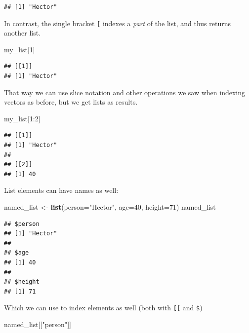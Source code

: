 \documentclass[]{article}
\newenvironment{Shaded}{\begin{snugshade}}{\end{snugshade}}
\newcommand{\KeywordTok}[1]{\textcolor[rgb]{0.13,0.29,0.53}{\textbf{{#1}}}}
\newcommand{\DataTypeTok}[1]{\textcolor[rgb]{0.13,0.29,0.53}{{#1}}}
\newcommand{\DecValTok}[1]{\textcolor[rgb]{0.00,0.00,0.81}{{#1}}}
\newcommand{\StringTok}[1]{\textcolor[rgb]{0.31,0.60,0.02}{{#1}}}
\newcommand{\NormalTok}[1]{{#1}}
\theoremstyle{definition}
\theoremstyle{definition}
\theoremstyle{remark}
\begin{document}
\begin{verbatim}
## [1] "Hector"
\end{verbatim}

In contrast, the single bracket \texttt{{[}} indexes a \emph{part} of
the list, and thus returns another list.

\begin{Shaded}
\begin{Highlighting}[]
\NormalTok{my_list[}\DecValTok{1}\NormalTok{]}
\end{Highlighting}
\end{Shaded}

\begin{verbatim}
## [[1]]
## [1] "Hector"
\end{verbatim}

That way we can use slice notation and other operations we saw when
indexing vectors as before, but we get lists as results.

\begin{Shaded}
\begin{Highlighting}[]
\NormalTok{my_list[}\DecValTok{1}\NormalTok{:}\DecValTok{2}\NormalTok{]}
\end{Highlighting}
\end{Shaded}

\begin{verbatim}
## [[1]]
## [1] "Hector"
## 
## [[2]]
## [1] 40
\end{verbatim}

List elements can have names as well:

\begin{Shaded}
\begin{Highlighting}[]
\NormalTok{named_list <-}\StringTok{ }\KeywordTok{list}\NormalTok{(}\DataTypeTok{person=}\StringTok{"Hector"}\NormalTok{, }\DataTypeTok{age=}\DecValTok{40}\NormalTok{, }\DataTypeTok{height=}\DecValTok{71}\NormalTok{)}
\NormalTok{named_list}
\end{Highlighting}
\end{Shaded}

\begin{verbatim}
## $person
## [1] "Hector"
## 
## $age
## [1] 40
## 
## $height
## [1] 71
\end{verbatim}

Which we can use to index elements as well (both with \texttt{{[}{[}}
and \texttt{\$})

\begin{Shaded}
\begin{Highlighting}[]
\NormalTok{named_list[[}\StringTok{"person"}\NormalTok{]]}
\end{Highlighting}
\end{Shaded}
\end{document}
